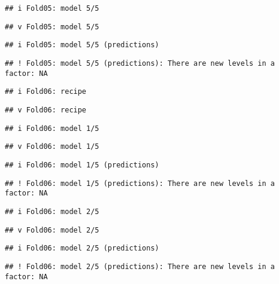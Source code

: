 \documentclass[
]{article}
\begin{document}
\begin{verbatim}
## i Fold05: model 5/5
\end{verbatim}

\begin{verbatim}
## v Fold05: model 5/5
\end{verbatim}

\begin{verbatim}
## i Fold05: model 5/5 (predictions)
\end{verbatim}

\begin{verbatim}
## ! Fold05: model 5/5 (predictions): There are new levels in a factor: NA
\end{verbatim}

\begin{verbatim}
## i Fold06: recipe
\end{verbatim}

\begin{verbatim}
## v Fold06: recipe
\end{verbatim}

\begin{verbatim}
## i Fold06: model 1/5
\end{verbatim}

\begin{verbatim}
## v Fold06: model 1/5
\end{verbatim}

\begin{verbatim}
## i Fold06: model 1/5 (predictions)
\end{verbatim}

\begin{verbatim}
## ! Fold06: model 1/5 (predictions): There are new levels in a factor: NA
\end{verbatim}

\begin{verbatim}
## i Fold06: model 2/5
\end{verbatim}

\begin{verbatim}
## v Fold06: model 2/5
\end{verbatim}

\begin{verbatim}
## i Fold06: model 2/5 (predictions)
\end{verbatim}

\begin{verbatim}
## ! Fold06: model 2/5 (predictions): There are new levels in a factor: NA
\end{verbatim}
\end{document}
